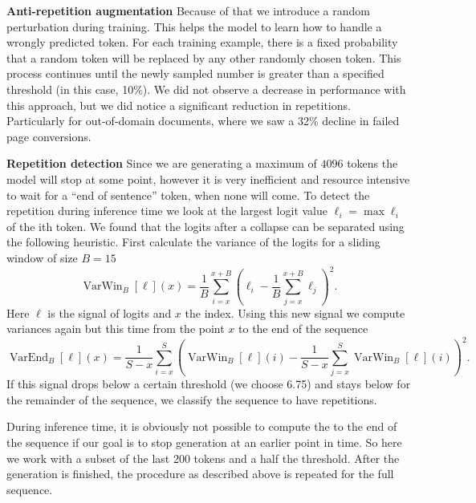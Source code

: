 \documentclass[]{article}
\newcommand{\para}[1]{\textbf{#1} \quad}
\begin{document}
\para{Anti-repetition augmentation}
Because of that we introduce a random perturbation during training. This helps the model to learn how to handle a wrongly predicted token.
For each training example, there is a fixed probability that a random token will be replaced by any other randomly chosen token. This process continues until the newly sampled number is greater than a specified threshold (in this case, 10\%). We did not observe a decrease in performance with this approach, but we did notice a significant reduction in repetitions. Particularly for out-of-domain documents, where we saw a 32\% decline in failed page conversions.

\para{Repetition detection}
Since we are generating a maximum of $4096$ tokens the model will stop at some point, however it is very inefficient and resource intensive to wait for a ``end of sentence'' token, when none will come. To detect the repetition during inference time we look at the largest logit value $\ell_i=\max \boldsymbol{ \ell}_i$ of the ith token. We found that the logits after a collapse can be separated using the following heuristic. First calculate the variance of the logits for a sliding window of size $B=15$
\begin{equation}
    \operatorname{VarWin}_B[ \boldsymbol\ell](x)=\frac1B\sum_{i=x}^{x+B}\left(\ell_i-\frac1B\sum_{j=x}^{x+B}\ell_j\right)^2.\nonumber
    \label{eq:varwin}
\end{equation}
Here $\ell$ is the signal of logits and $x$ the index. Using this new signal we compute variances again but this time from the point $x$ to the end of the sequence
\begin{equation}
    \operatorname{VarEnd}_B[ \boldsymbol\ell](x)=\frac{1}{S-x}\sum_{i=x}^{S}\left(\operatorname{VarWin}_B[ \boldsymbol\ell](i)-\frac{1}{S-x}\sum_{j=x}^{S}\operatorname{VarWin}_B[ \boldsymbol\ell](i) \right)^2.\nonumber
    \label{eq:varend}
\end{equation}
If this signal drops below a certain threshold (we choose 6.75) and stays below for the remainder of the sequence, we classify the sequence to have repetitions.

During inference time, it is obviously not possible to compute the to the end of the sequence if our goal is to stop generation at an earlier point in time. So here we work with a subset of the last 200 tokens and a half the threshold. After the generation is finished, the procedure as described above is repeated for the full sequence.
\end{document}
